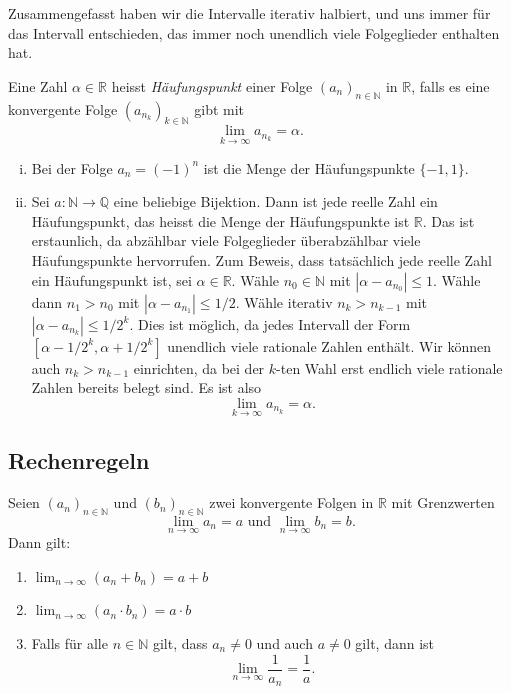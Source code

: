 \documentclass[../main.tex]{subfiles}
\begin{document}
Zusammengefasst haben wir die Intervalle
iterativ halbiert, und uns immer für das Intervall
entschieden, das immer noch unendlich viele
Folgeglieder enthalten hat.

\begin{definition}
  Eine Zahl $\alpha \in \mathbb{R}$ heisst
  \emph{Häufungspunkt} einer Folge
  ${(a_{n})}_{n \in \mathbb{N}}$ in $\mathbb{R}$,
  falls es eine konvergente Folge
  ${(a_{n_k})}_{k \in \mathbb{N}}$ gibt
  mit
  \[
    \lim_{k \to \infty} a_{n_k} = \alpha.
  \]
\end{definition}

\begin{example}
  \leavevmode
  \begin{enumerate}[(i)]
    \item Bei der Folge $a_n = (-1)^n$ ist die Menge
      der Häufungspunkte $\{-1, 1\}$.
    \item Sei $a \colon \mathbb{N} \to \mathbb{Q}$ eine
      beliebige
      Bijektion. Dann ist jede reelle Zahl ein Häufungspunkt,
      das heisst die Menge der Häufungspunkte
      ist $\mathbb{R}$. Das ist erstaunlich, da abzählbar
      viele Folgeglieder überabzählbar viele
      Häufungspunkte hervorrufen. Zum Beweis,
      dass tatsächlich jede reelle Zahl ein Häufungspunkt
      ist, sei $\alpha \in \mathbb{R}$. Wähle
      $n_0 \in \mathbb{N}$ mit $|\alpha - a_{n_0}| \leq 1$.
      Wähle dann $n_{1} > n_0$ mit $|\alpha - a_{n_1}| \leq 1/2$.
      Wähle iterativ $n_{k} > n_{k-1}$ mit $|\alpha - a_{n_k}|
      \leq 1/2^k$. Dies ist möglich, da jedes Intervall der
      Form
      $[\alpha - 1/2^k, \alpha + 1/2^k]$ unendlich viele
      rationale Zahlen enthält. Wir können auch $n_k > n_{k-1}$
      einrichten, da bei der $k$-ten Wahl erst endlich viele
      rationale Zahlen bereits belegt sind.
      Es ist also
      \[
        \lim_{k \to \infty} a_{n_k} = \alpha.
      \]
  \end{enumerate}
\end{example}


\subsection*{Rechenregeln}
\begin{proposition}
  Seien ${(a_n)}_{n \in \mathbb{N}}$ und
  ${(b_n)}_{n \in \mathbb{N}}$ zwei
  konvergente Folgen in $\mathbb{R}$ mit Grenzwerten
  \[
    \lim_{n \to \infty} a_n = a \text{ und }
    \lim_{n \to \infty} b_n = b.
  \]
  Dann gilt:
  \begin{enumerate}[\normalfont(i)]
    \item $\lim_{n \to \infty} (a_n + b_n) = a + b$ 
    \item $\lim_{n \to \infty} (a_n \cdot b_n) = a \cdot b$
    \item Falls für alle $n \in \mathbb{N}$ gilt,
      dass $a_n \neq 0$ und auch $a \neq 0$ gilt,
      dann ist
      \[
        \lim_{n \to \infty} \frac{1}{a_n} = \frac{1}{a}.
      \]
  \end{enumerate}
\end{proposition}
\end{document}

